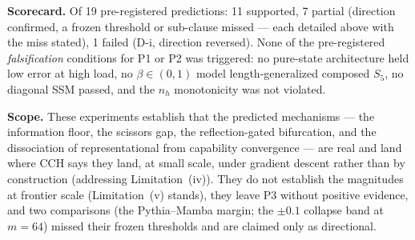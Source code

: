 \textbf{Scorecard.} Of 19 pre-registered predictions: 11 supported, 7 partial
(direction confirmed, a frozen threshold or sub-clause missed --- each
detailed above with the miss stated), 1 failed (D-i, direction reversed).
None of the pre-registered \emph{falsification} conditions for P1 or P2 was
triggered: no pure-state architecture held low error at high load, no
$\beta\in(0,1)$ model length-generalized composed $S_5$, no diagonal SSM
passed, and the $n_h$ monotonicity was not violated.

\textbf{Scope.} These experiments establish that the predicted mechanisms ---
the information floor, the scissors gap, the reflection-gated bifurcation, and
the dissociation of representational from capability convergence --- are real
and land where CCH says they land, at small scale, under gradient descent
rather than by construction (addressing Limitation~(iv)). They do not
establish the magnitudes at frontier scale (Limitation~(v) stands), they
leave P3 without positive evidence, and two comparisons (the Pythia--Mamba
margin; the $\pm 0.1$ collapse band at $m{=}64$) missed their frozen
thresholds and are claimed only as directional.

%
%
%
